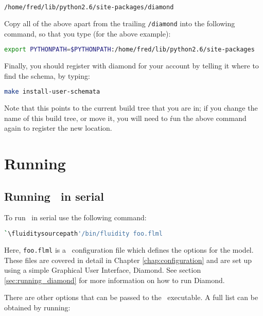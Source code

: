 \begin{lstlisting}[language=Bash]
/home/fred/lib/python2.6/site-packages/diamond
\end{lstlisting}

Copy all of the above apart from the trailing
\lstinline[language=Bash]+/diamond+ into the following command, so that you
type (for the above example):

\begin{lstlisting}[language=Bash]
export PYTHONPATH=$PYTHONPATH:/home/fred/lib/python2.6/site-packages
\end{lstlisting}

Finally, you should register \fluidity with diamond for your account by
telling it where to find the \fluidity schema, by typing:

\begin{lstlisting}[language=Bash]
make install-user-schemata
\end{lstlisting}

Note that this points to the current build tree that you are in; if you change
the name of this build tree, or move it, you will need to ŕun the above command
again to register the new location.

\section{Running \fluidity}
\label{sec:running_fluidity}


\subsection{Running \fluidity\ in serial}
\label{sec:running_fluidity_in_serial}

To run \fluidity\ in serial use the following command:

\begin{lstlisting}[language=bash]
`\fluiditysourcepath'/bin/fluidity foo.flml
\end{lstlisting}

Here, \lstinline[language=Bash]+foo.flml+ is a \fluidity\ configuration file
which defines the options for the model. These files are covered in detail in 
Chapter \ref{chap:configuration} and are set up using a simple Graphical User
Interface, Diamond. See section \ref{sec:running_diamond} for more information 
on how to run Diamond.

There are other options that can be passed to the \fluidity\ executable. A full
list can be obtained by running:

